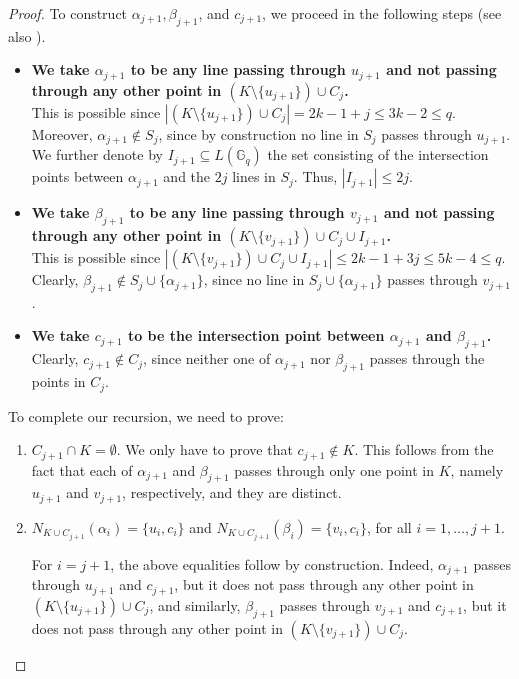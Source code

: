\documentclass[10pt,a4paper]{article}
\newcommand{\ls}{\leqslant}
\newcommand{\G}[1][q]{\mathbb{G}_{#1}}
\begin{document}
\begin{proof}
    \noindent To construct $\alpha_{j+1}, \beta_{j+1}$, and $c_{j+1}$, we proceed in the following steps (see also ). 
    \begin{itemize}
        \item  \textbf{We take $\alpha_{j+1}$ to be any line passing through $u_{j+1}$ and not passing through any other point in $\left(K\setminus\{u_{j+1}\}\right) \cup C_{j}$.} \\ 
        This is possible since $|(K\setminus\{u_{j+1}\}) \cup C_{j}| = 2k-1 + j \ls 3k-2 \ls q$. Moreover,  $\alpha_{j+1} \not\in S_j$, since by construction no line in $S_j$ passes through $u_{j+1}$.
        We further denote by $I_{j+1} \subseteq L(\G)$ the set consisting of the intersection points between $\alpha_{j+1}$ and the $2j$ lines in $S_j$. Thus, $|I_{j+1}| \ls 2j$.
        \item \textbf{We take $\beta_{j+1}$ to be any line passing through $v_{j+1}$ and not passing through any other point in $(K\setminus\{v_{j+1}\}) \cup C_{j} \cup I_{j+1}$.} \\
        This is possible since $|(K\setminus\{v_{j+1}\}) \cup C_{j} \cup I_{j+1}| \ls 2k-1 + 3j \ls 5k-4 \ls q$. Clearly,  $\beta_{j+1} \not\in S_j \cup \{\alpha_{j+1} \}$, since no line in $S_j \cup \{\alpha_{j+1} \}$ passes through $v_{j+1}$.
        \item \textbf{We take $c_{j+1}$ to be the intersection point between  $\alpha_{j+1}$ and $\beta_{j+1}$.} \\ Clearly,  $c_{j+1} \not\in C_j$, since neither one of $\alpha_{j+1}$ nor $\beta_{j+1}$ passes through the points in $C_j$.
    \end{itemize}

    \noindent To complete our recursion, we need to prove:
    \begin{enumerate}
        \item $C_{j+1} \cap K = \emptyset$. We only have to prove that $c_{j+1} \not\in K$. This follows from the fact that each of $\alpha_{j+1}$ and $\beta_{j+1}$ passes through only one point in $K$, namely $u_{j+1}$ and $v_{j+1}$, respectively, and they are distinct.
        \item $N_{K \cup C_{j+1}} (\alpha_i) = \{u_i, c_i\}$ and $N_{K \cup C_{j+1}} (\beta_i) = \{v_i, c_i\}$, for all $i=1,\dots,j+1$.

        For $i=j+1$, the above equalities follow  by construction. Indeed, $\alpha_{j+1}$ passes through $u_{j+1}$ and $c_{j+1}$, but it does not pass through any other point in $(K\setminus\{u_{j+1}\}) \cup C_{j}$, and similarly, $\beta_{j+1}$ passes through $v_{j+1}$ and $c_{j+1}$, but it does not pass through any other point in $(K\setminus\{v_{j+1}\}) \cup C_{j}$.


\end{enumerate}
\end{proof}
\end{document}
